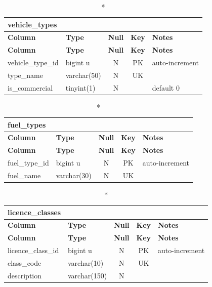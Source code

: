 \vspace{-0.4em}
\begin{longtable}{@{}p{3.4cm}p{2.9cm}c c p{5.6cm}@{}}
\caption*{\textbf{vehicle\_\allowbreak{}types}}\\
\toprule \textbf{Column} & \textbf{Type} & \textbf{Null} & \textbf{Key} & \textbf{Notes} \\ \midrule \endfirsthead
\toprule \textbf{Column} & \textbf{Type} & \textbf{Null} & \textbf{Key} & \textbf{Notes} \\ \midrule \endhead
\bottomrule \endlastfoot
vehicle\_\allowbreak{}type\_\allowbreak{}id & bigint u & N & PK & auto-increment \\
type\_\allowbreak{}name & varchar(50) & N & UK &  \\
is\_\allowbreak{}commercial & tinyint(1) & N &  & default 0 \\
\end{longtable}
\vspace{-0.4em}
\begin{longtable}{@{}p{3.4cm}p{2.9cm}c c p{5.6cm}@{}}
\caption*{\textbf{fuel\_\allowbreak{}types}}\\
\toprule \textbf{Column} & \textbf{Type} & \textbf{Null} & \textbf{Key} & \textbf{Notes} \\ \midrule \endfirsthead
\toprule \textbf{Column} & \textbf{Type} & \textbf{Null} & \textbf{Key} & \textbf{Notes} \\ \midrule \endhead
\bottomrule \endlastfoot
fuel\_\allowbreak{}type\_\allowbreak{}id & bigint u & N & PK & auto-increment \\
fuel\_\allowbreak{}name & varchar(30) & N & UK &  \\
\end{longtable}
\vspace{-0.4em}
\begin{longtable}{@{}p{3.4cm}p{2.9cm}c c p{5.6cm}@{}}
\caption*{\textbf{licence\_\allowbreak{}classes}}\\
\toprule \textbf{Column} & \textbf{Type} & \textbf{Null} & \textbf{Key} & \textbf{Notes} \\ \midrule \endfirsthead
\toprule \textbf{Column} & \textbf{Type} & \textbf{Null} & \textbf{Key} & \textbf{Notes} \\ \midrule \endhead
\bottomrule \endlastfoot
licence\_\allowbreak{}class\_\allowbreak{}id & bigint u & N & PK & auto-increment \\
class\_\allowbreak{}code & varchar(10) & N & UK &  \\
description & varchar(150) & N &  &  \\
\end{longtable}
